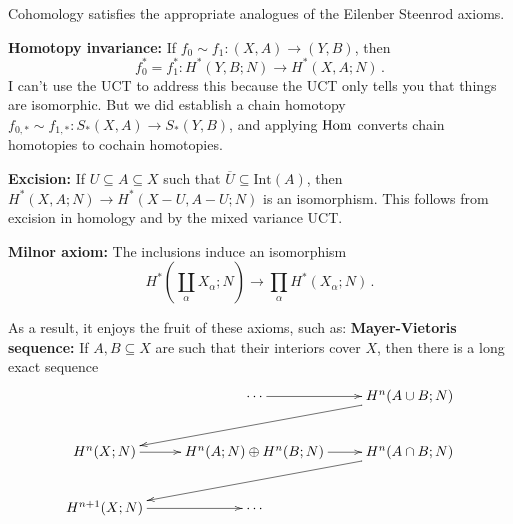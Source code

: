 Cohomology satisfies the appropriate analogues of the Eilenber Steenrod axioms.

\noindent
\textbf{Homotopy invariance:}
If $f_0\sim f_1:(X,A)\to (Y,B)$, then 
\[
f_0^*=f_1^*:H^\ast(Y,B;N)\to H^\ast(X,A;N)\,.
\]
I can't use the UCT to address this because the UCT only tells you that things are isomorphic. But we did establish a chain homotopy $f_{0,\ast}\sim f_{1,\ast}:S_\ast(X,A)\to S_\ast(Y,B)$, and applying $\operatorname{Hom}$ converts chain homotopies to cochain homotopies. 

\noindent
\textbf{Excision:} If $U\subseteq A\subseteq X$ such that $\overline{U}\subseteq\mathrm{Int}(A)$, then $ H^\ast(X,A;N)\to H^\ast(X-U,A-U;N)$ is an isomorphism. This follows from excision in homology and by the mixed variance UCT.

\noindent
\textbf{Milnor axiom:} The inclusions induce an isomorphism
\[
H^*(\coprod_\alpha X_\alpha;N)\to \prod_\alpha H^*(X_\alpha;N)\,.
\]

As a result, it enjoys the fruit of these axioms, such as:
\noindent
\textbf{Mayer-Vietoris sequence:} If $A,B\subseteq X$ are such that their interiors cover $X$, then there is a long exact sequence
\begin{equation*}
\xymatrix{ & \cdots \ar[r] & H^n(A\cup B;N) \ar[dll]\\
 H^n(X;N)\ar[r] & H^n(A;N)\oplus H^n(B;N)\ar[r] & H^n(A\cap B;N)\ar[dll]\\
 H^{n+1}(X;N)\ar[r] & \cdots & }
\end{equation*}







